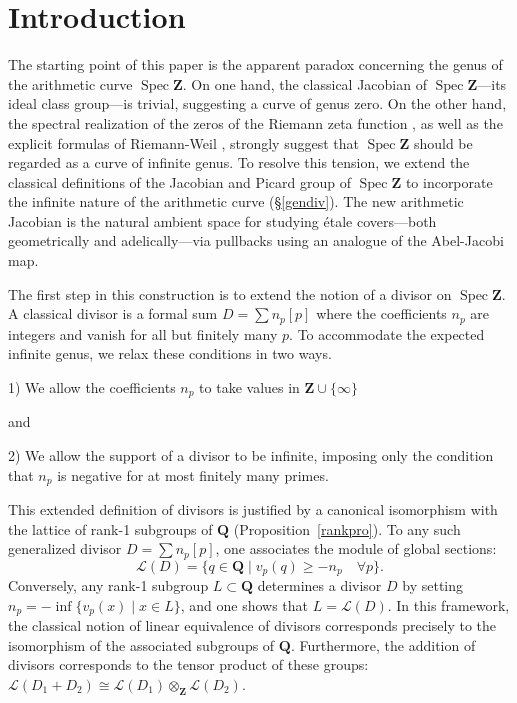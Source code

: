 \documentclass[11pt,a4paper]{article}
\newcommand{\Q}{\mathbf{Q}}
\newcommand{\Z}{\mathbf{Z}}
\def\spz{\Spec \Z}
\newcommand{\Spec}{\operatorname{Spec}}
\def\spz{\Spec \Z}
\theoremstyle{plain}
\theoremstyle{definition} %
\begin{document}
\section{Introduction}

The starting point of this paper is the apparent paradox concerning the genus of the arithmetic curve $\spz$. On one hand, the classical Jacobian of $\spz$—its ideal class group—is trivial, suggesting a curve of genus zero. On the other hand, the spectral realization of the zeros of the Riemann zeta function \cite{Co-zeta}, as well as the explicit formulas of Riemann-Weil \cite{Weil}, strongly suggest that $\spz$ should be regarded as a curve of infinite genus.
To resolve this tension, we extend the classical definitions of the Jacobian and Picard group of $\spz$ to incorporate the infinite nature of the arithmetic curve (\S\ref{gendiv}). The new arithmetic Jacobian is the natural ambient space for studying étale covers—both geometrically and adelically—via pullbacks using an analogue of the Abel-Jacobi map.

The first step in this construction is to extend the notion of a divisor on $\spz$. A classical divisor is a formal sum $D = \sum n_p [p]$ where the coefficients $n_p$ are integers and vanish for all but finitely many $p$. To accommodate the expected infinite genus, we relax these conditions in two ways.\vspace{.02in}

1) We allow the coefficients $n_p$ to take values in  $\Z \cup \{\infty\}$\vspace{.02in}

    and\vspace{.02in}
    
2) We allow the support of a divisor to be infinite, imposing only the condition that $n_p$ is negative for at most finitely many primes.\vspace{.02in}




This extended definition of divisors is justified by a canonical isomorphism  with the lattice of rank-1 subgroups of $\Q$ (Proposition~\ref{rankpro}). To any such generalized divisor $D = \sum n_p [p]$, one associates the module of global sections:
\[
\mathcal L(D) = \{ q \in \Q \mid v_p(q) \ge -n_p \quad \forall p \}.
\]
Conversely, any rank-1 subgroup $L \subset \Q$ determines a divisor $D$ by setting \sloppy $n_p = -\inf \{ v_p(x) \mid x \in L \}$, and one shows that $L=\mathcal L(D)$. 
In this framework, the classical notion of linear equivalence of divisors corresponds precisely to the isomorphism of the associated subgroups of $\Q$. Furthermore, the addition of divisors corresponds to the tensor product of these groups:
$
\mathcal L(D_1 + D_2) \cong \mathcal L(D_1) \otimes_\Z \mathcal L(D_2)
$.
\end{document}

